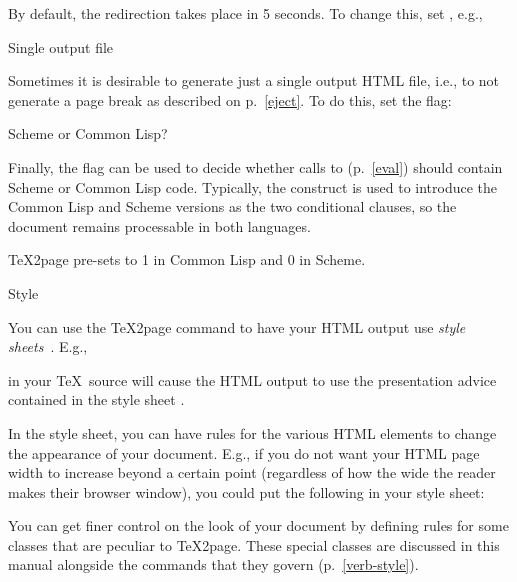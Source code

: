 By default, the redirection takes place in 5 seconds. To change
this, set \p{\TZPredirectseconds}, e.g.,


\beginsection Single output file

%
Sometimes it is desirable to generate just a single output HTML
file, i.e., to not generate a page break as described on
p.~\ref{eject}. To do this, set the \p{\TZPsinglepage} flag:


\beginsection Scheme or Common Lisp?

Finally, the flag \p{\TZPcommonlisp} can be used to decide whether calls to
\p{\eval} (p.~\ref{eval}) should contain Scheme or Common Lisp code.
Typically, the construct  is used to introduce
the Common Lisp and Scheme versions as the two conditional clauses, so
the document remains processable in both languages.

\TeX2page pre-sets \p{\TZPcommonlisp} to 1 in Common Lisp and 0 in Scheme.

 Style

%
You can use the \TeX2page command  to have your HTML output use {\em style
sheets}~\cite{w3c:css,lb:css,htmlhelp:css}.  E.g.,


\n in your \TeX\ source will cause the HTML output to
use the presentation advice contained in the
style sheet .

In the style sheet, you can have rules for the various
HTML elements to change the appearance of your
document.  E.g., if you do not want your HTML page
width to increase beyond a certain point (regardless of
how the wide the reader makes their browser window),
you could put the following in your style sheet:


You can get finer control on the look of your document
by defining rules for some classes that are peculiar to
\TeX2page.  These special classes
are discussed in this manual alongside the commands
that they govern (p.~\ref{verb-style}).

